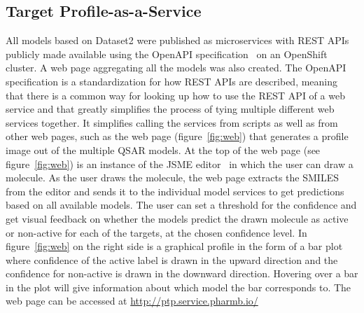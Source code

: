 \documentclass[utf8]{frontiersSCNS} %
\newcommand{\inlinetodo}[1]{{\color{magenta}\oldtodo[inline]{\color{white}\textsf{\small#1}}}}
\begin{document}
\subsection{Target Profile-as-a-Service}
All models based on Dataset2 were published as microservices with REST APIs
publicly made available using the OpenAPI specification~\cite{OpenAPI} on an OpenShift~\cite{OpenShift} cluster.
A web page aggregating all the models was also created. The OpenAPI
specification is a standardization for how REST APIs are described, meaning
that there is a common way for looking up how to use the REST API of a web
service and that greatly simplifies the process of tying multiple different web
services together. It simplifies calling the services from scripts as well as
from other web pages, such as the web page (figure~\ref{fig:web}) that generates a profile image out of
the multiple QSAR models. At the top of the web page (see figure~\ref{fig:web})
is an instance of the JSME editor~\cite{Bienfait2013} in which the user can
draw a molecule. As the user draws the molecule, the web page extracts the
SMILES from the editor and sends it to the individual model services to get predictions
based on all available models. The user can set a threshold for the confidence
and get visual feedback on whether the models predict the drawn molecule as
active or non-active for each of the targets, at the chosen confidence level. In figure~\ref{fig:web} on
the right side is a graphical profile in the form of a bar plot where confidence of
the active label is drawn in the upward direction and the confidence for
non-active is drawn in the downward direction. Hovering over a bar in the plot will
give information about which model the bar corresponds to. The web page can
be accessed at \url{http://ptp.service.pharmb.io/}
\end{document}
